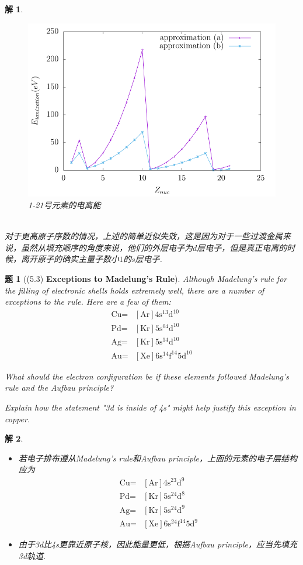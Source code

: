 \documentclass[UTF8,10pt,a4paper]{article}
\theoremstyle{Problem}
\newtheorem{prob}{题}
\theoremstyle{Solution}
\newtheorem*{sol}{解}
\begin{document}
\begin{sol}
\begin{enumerate}
\begin{itemize}
            \begin{figure}[h]
                \centering
                \includegraphics[width=.4\textwidth]{1-E-Z.pdf}
                \caption{1-21号元素的电离能}
                \label{1-E-Z}
            \end{figure}
            \\对于更高原子序数的情况，上述的简单近似失效，这是因为对于一些过渡金属来说，虽然从填充顺序的角度来说，他们的外层电子为$d$层电子，但是真正电离的时候，离开原子的确实主量子数小$1$的$s$层电子.
        \end{itemize}
    \end{enumerate}
\end{sol}

\begin{prob}[(5.3) \textbf{Exceptions to Madelung's Rule}]
    Although Madelung's rule for the filling of electronic shells holds extremely well, there are a number of exceptions to the rule. Here are a few of them:
    \begin{align*}
        \text{Cu}=&[\text{Ar}]4\text{s}^13\text{d}^{10}\\
        \text{Pd}=&[\text{Kr}]5\text{s}^04\text{d}^{10}\\
        \text{Ag}=&[\text{Kr}]5\text{s}^14\text{d}^{10}\\
        \text{Au}=&[\text{Xe}]6\text{s}^14\text{f}^{14}5\text{d}^{10}
    \end{align*}
    \item[$\triangleright$] What should the electron configuration be if these elements followed Madelung's rule and the Aufbau principle?
    \item[$\triangleright$] Explain how the statement "3d is inside of 4s" might help justify this exception in copper.
\end{prob}
\begin{sol}
    \begin{itemize}
        \item[$\triangleright$] 若电子排布遵从Madelung's rule和Aufbau principle，上面的元素的电子层结构应为
        \begin{align*}
            \text{Cu}=&[\text{Ar}]4\text{s}^23\text{d}^9\\
            \text{Pd}=&[\text{Kr}]5\text{s}^24\text{d}^8\\
            \text{Ag}=&[\text{Kr}]5\text{s}^24\text{d}^9\\
            \text{Au}=&[\text{Xe}]6\text{s}^24\text{f}^{14}5\text{d}^9
        \end{align*}
        \item[$\triangleright$] 由于3d比4s更靠近原子核，因此能量更低，根据Aufbau principle，应当先填充3d轨道.
    \end{itemize}
\end{sol}
\end{document}

